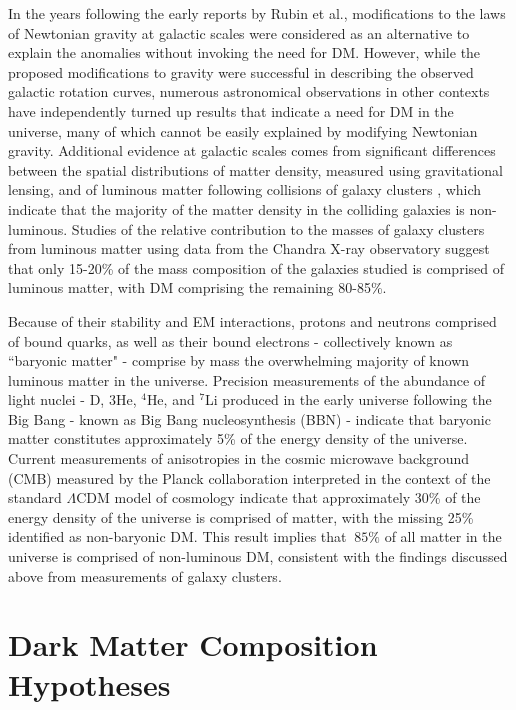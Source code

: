 In the years following the early reports by Rubin et al., modifications to the laws of Newtonian gravity at galactic scales \cite{mond_1983} were considered as an alternative to explain the anomalies without invoking the need for DM. However, while the proposed modifications to gravity were successful in describing the observed galactic rotation curves, numerous astronomical observations in other contexts have independently turned up results that indicate a need for DM in the universe, many of which cannot be easily explained by modifying Newtonian gravity. Additional evidence at galactic scales comes from significant differences between the spatial distributions of matter density, measured using gravitational lensing, and of luminous matter following collisions of galaxy clusters \cite{bullet_1995}, which indicate that the majority of the matter density in the colliding galaxies is non-luminous. Studies of the relative contribution to the masses of galaxy clusters from luminous matter using data from the Chandra X-ray observatory \cite{Chandra_2013} suggest that only 15-20\% of the mass composition of the galaxies studied is comprised of luminous matter, with DM comprising the remaining 80-85\%.

Because of their stability and EM interactions, protons and neutrons comprised of bound quarks, as well as their bound electrons - collectively known as ``baryonic matter" - comprise by mass the overwhelming majority of known luminous matter in the universe. Precision measurements of the abundance of light nuclei - D, 3He, \(^4\)He, and \(^7\)Li  produced in the early universe following the Big Bang \cite{uzan2016bigbang} - known as Big Bang nucleosynthesis (BBN) \cite{pdg_2018} - indicate that baryonic matter constitutes approximately 5\% \cite{pdg_2018} of the energy density of the universe. Current measurements of anisotropies in the cosmic microwave background (CMB) \cite{cmb_1965} measured by the Planck collaboration \cite{Planck_2020} interpreted in the context of the standard \(\Lambda\)CDM model of cosmology \cite{pdg_2018} indicate that approximately 30\% of the energy density of the universe is comprised of matter, with the missing 25\% identified as non-baryonic DM. This result implies that \(~85\%\) of all matter in the universe is comprised of non-luminous DM, consistent with the findings discussed above from measurements of galaxy clusters.

\section{Dark Matter Composition Hypotheses}


